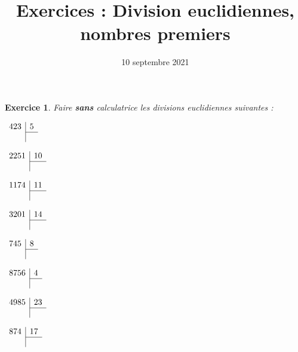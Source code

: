 \documentclass[a4paper]{article}
\title{Exercices : Division euclidiennes, nombres premiers}
\date{10 septembre 2021}
\theoremstyle{exostyle}
\newtheorem{exercice}{Exercice}
\begin{document}
\maketitle

\begin{exercice}
	Faire \textbf{sans} calculatrice les divisions euclidiennes suivantes :
	\begin{enumerate}
		\begin{minipage}{0.45\linewidth}
			\item $\begin{array}{r|r}
					423 & 5 \\
					\cline{2-2}
					    &
				\end{array}$
			\item $\begin{array}{r|r}
					2251 & 10 \\
					\cline{2-2}
					     &
				\end{array}$
			\item $\begin{array}{r|r}
					1174 & 11 \\
					\cline{2-2}
					     &
				\end{array}$
			\item $\begin{array}{r|r}
					3201 & 14 \\
					\cline{2-2}
					     &
				\end{array}$
		\end{minipage}
		\begin{minipage}{0.45\linewidth}
			\item $\begin{array}{r|r}
					745 & 8 \\
					\cline{2-2}
					    &
				\end{array}$
			\item $\begin{array}{r|r}
					8756 & 4 \\
					\cline{2-2}
					     &
				\end{array}$
			\item $\begin{array}{r|r}
					4985 & 23 \\
					\cline{2-2}
					     &
				\end{array}$
			\item $\begin{array}{r|r}
					874 & 17 \\
					\cline{2-2}
					    &
				\end{array}$
		\end{minipage}
	\end{enumerate}
\end{exercice}
\end{document}
